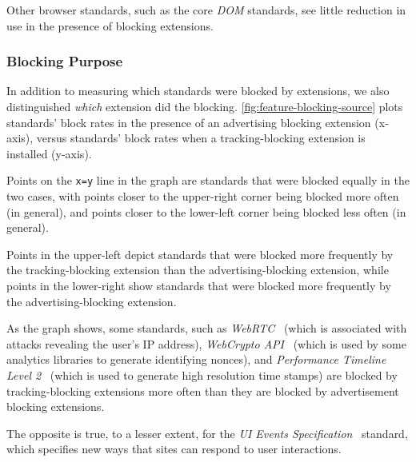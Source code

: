 Other browser standards, such as the core \textit{DOM} standards, see little
reduction in use in the presence of blocking extensions.


\subsubsection{Blocking Purpose}

In addition to measuring which standards were blocked by extensions, we also
distinguished \emph{which} extension did the blocking.
\ref{fig:feature-blocking-source} plots standards' block rates in the
presence of an advertising blocking extension (x-axis), versus standards' block
rates when a tracking-blocking extension is installed (y-axis).

Points on the \texttt{x=y} line in the graph are standards that were blocked
equally in the two cases, with points closer to the upper-right corner being
blocked more often (in general), and points closer to the lower-left corner
being blocked less often (in general).

Points in the upper-left depict standards that were blocked more frequently by
the tracking-blocking extension than the advertising-blocking extension, while
points in the lower-right show standards that were blocked more frequently by
the advertising-blocking extension.

As the graph shows, some standards, such as \textit{WebRTC}~\cite{webrtcw3c}
(which is associated with attacks revealing the user's IP address),
\textit{WebCrypto API}~\cite{webcryptow3c} (which is used by some analytics
libraries to generate identifying nonces), and \textit{Performance Timeline Level
2}~\cite{perftimingw3c} (which is used to generate high resolution time stamps)
are blocked by tracking-blocking extensions more often than they are blocked by
advertisement blocking extensions.

The opposite is true, to a lesser extent, for the \textit{UI Events
Specification}~\cite{uievents3c} standard, which specifies new ways that sites
can respond to user interactions.
